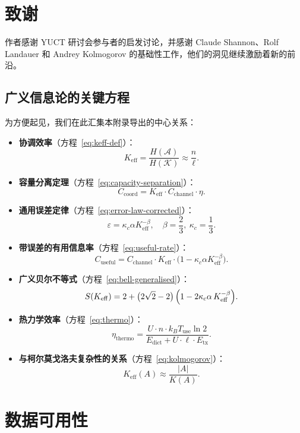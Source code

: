 \documentclass[12pt,a4paper]{article}
\theoremstyle{remark}
\newcommand{\Keff}{K_{\mathrm{eff}}}
\begin{document}
	\section*{致谢}
	
	作者感谢 YUCT 研讨会参与者的启发讨论，并感谢 Claude Shannon、Rolf Landauer 和 Andrey Kolmogorov 的基础性工作，他们的洞见继续激励着新的前沿。
	
	\subsection*{广义信息论的关键方程}
	为方便起见，我们在此汇集本附录导出的中心关系：
	
	\begin{itemize}
		\item \textbf{协调效率}（方程~\eqref{eq:keff-def}）：
		\[
		\Keff = \frac{H(\mathcal{A})}{H(\mathcal{K})} \approx \frac{n}{\ell}.
		\]
		
		\item \textbf{容量分离定理}（方程~\eqref{eq:capacity-separation}）：
		\[
		C_{\text{coord}} = \Keff \cdot C_{\text{channel}} \cdot \eta.
		\]
		
		\item \textbf{通用误差定律}（方程~\eqref{eq:error-law-corrected}）：
		\[
		\varepsilon = \kappa_c \alpha K_{\mathrm{eff}}^{-\beta}, \quad \beta = \frac{2}{3},\ \kappa_c = \frac{1}{3}.
		\]
		
		\item \textbf{带误差的有用信息率}（方程~\eqref{eq:useful-rate}）：
		\[
		C_{\text{useful}} = C_{\text{channel}} \cdot \Keff \cdot \bigl(1 - \kappa_c \alpha K_{\mathrm{eff}}^{-\beta}\bigr).
		\]
		
		\item \textbf{广义贝尔不等式}（方程~\eqref{eq:bell-generalised}）：
		\[
		S(K_{\mathrm{eff}}) = 2 + \bigl(2\sqrt{2}-2\bigr)\,\Bigl(1 - 2\kappa_c\alpha\,K_{\mathrm{eff}}^{-\beta}\Bigr).
		\]
		
		\item \textbf{热力学效率}（方程~\eqref{eq:thermo}）：
		\[
		\eta_{\text{thermo}} = \frac{U \cdot n \cdot k_B T_{\text{use}} \ln 2}{E_{\text{dict}} + U \cdot \ell \cdot E_{\text{tx}}}.
		\]
		
		\item \textbf{与柯尔莫戈洛夫复杂性的关系}（方程~\eqref{eq:kolmogorov}）：
		\[
		\Keff(A) \approx \frac{|A|}{K(A)}.
		\]
	\end{itemize}
	
	\section*{数据可用性}
	
\end{document}
